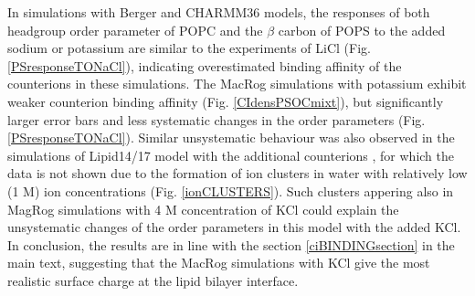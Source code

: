 \documentclass[journal=jpcbfk]{achemso}
\begin{document}
In simulations with Berger and CHARMM36 models, the responses of both headgroup order parameter
of POPC and the $\beta$ carbon of POPS to the added sodium or potassium are similar to the experiments
of LiCl (Fig. \ref{PSresponseTONaCl}), indicating overestimated binding affinity of the counterions 
in these simulations. The MacRog simulations with potassium exhibit weaker counterion binding affinity
(Fig. \ref{CIdensPSOCmixt}), but significantly larger error bars and
less systematic changes in the order parameters (Fig. \ref{PSresponseTONaCl}).
Similar unsystematic behaviour was also observed in the simulations of Lipid14/17 model
with the additional counterions \cite{POPCpopsLIPID17withKCI,POPCpopsLIPID17withK,POPCpopsLIPID17withNaCI,POPCpopsLIPID17withNa},
for which the data is not shown due to the formation of
ion clusters in water with relatively low (1 M) ion concentrations (Fig. \ref{ionCLUSTERS}).
Such clusters appering also in MagRog simulations with 4 M concentration of KCl
could explain the unsystematic changes of the order parameters in this model with the added KCl.
In conclusion, the results are in line with the section \ref{ciBINDINGsection}
in the main text, suggesting that the MacRog simulations with KCl give the most
realistic surface charge at the lipid bilayer interface.
\end{document}
